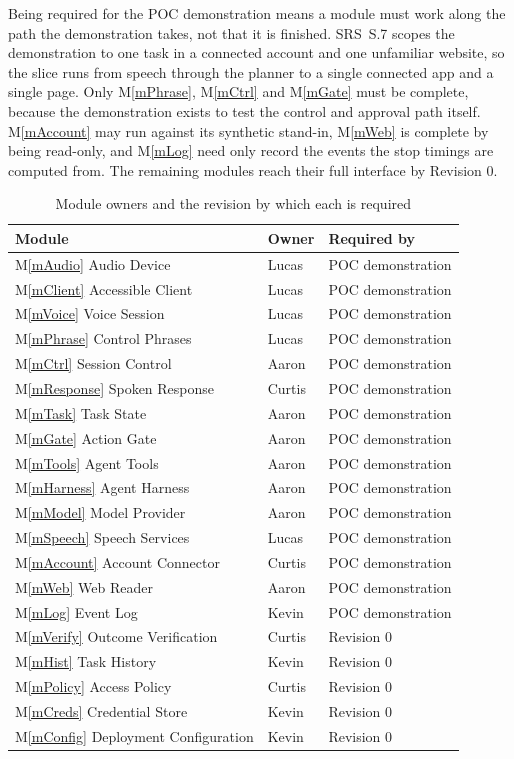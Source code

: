 \documentclass[12pt, titlepage]{article}
\newcommand{\mref}[1]{M\ref{#1}}
\begin{document}
Being required for the POC demonstration means a module must work along the path the
demonstration takes, not that it is finished. SRS~S.7 scopes the demonstration to
one task in a connected account and one unfamiliar website, so the slice runs from
speech through the planner to a single connected app and a single page. Only
\mref{mPhrase}, \mref{mCtrl} and \mref{mGate} must be complete, because the
demonstration exists to test the control and approval path itself.
\mref{mAccount} may run against its synthetic stand-in, \mref{mWeb} is complete
by being read-only, and \mref{mLog} need only record the events the stop timings
are computed from. The remaining modules reach their full interface by
Revision 0.

\begin{table}[H]
\centering
\begin{tabular}{p{} p{} p{}}
\toprule
\textbf{Module} & \textbf{Owner} & \textbf{Required by}\\
\midrule
\mref{mAudio} Audio Device & Lucas & POC demonstration\\
\mref{mClient} Accessible Client & Lucas & POC demonstration\\
\mref{mVoice} Voice Session & Lucas & POC demonstration\\
\mref{mPhrase} Control Phrases & Lucas & POC demonstration\\
\mref{mCtrl} Session Control & Aaron & POC demonstration\\
\mref{mResponse} Spoken Response & Curtis & POC demonstration\\
\mref{mTask} Task State & Aaron & POC demonstration\\
\mref{mGate} Action Gate & Aaron & POC demonstration\\
\mref{mTools} Agent Tools & Aaron & POC demonstration\\
\mref{mHarness} Agent Harness & Aaron & POC demonstration\\
\mref{mModel} Model Provider & Aaron & POC demonstration\\
\mref{mSpeech} Speech Services & Lucas & POC demonstration\\
\mref{mAccount} Account Connector & Curtis & POC demonstration\\
\mref{mWeb} Web Reader & Aaron & POC demonstration\\
\mref{mLog} Event Log & Kevin & POC demonstration\\
\midrule
\mref{mVerify} Outcome Verification & Curtis & Revision 0\\
\mref{mHist} Task History & Kevin & Revision 0\\
\mref{mPolicy} Access Policy & Curtis & Revision 0\\
\mref{mCreds} Credential Store & Kevin & Revision 0\\
\mref{mConfig} Deployment Configuration & Kevin & Revision 0\\
\bottomrule
\end{tabular}
\caption{Module owners and the revision by which each is required}
\label{TblTimeline}
\end{table}
\end{document}
